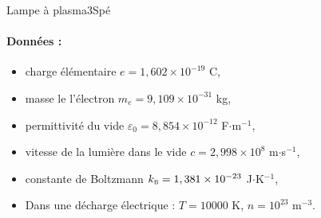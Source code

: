 \begin{exercise}{Lampe à plasma}{3}{Spé}
\paragraph{Données :}
\begin{itemize}
    \item charge élémentaire $e = 1,602\times 10^{-19}$ C,
    \item masse le l'électron $m_e = 9,109\times 10^{-31}$ kg,
    \item permittivité du vide $\varepsilon_0 = 8,854\times 10^{-12}$ F$\cdot$m$^{-1}$,
    \item vitesse de la lumière dans le vide $c = 2,998 \times 10^8$ m$\cdot$s$^{-1}$,
    \item constante de Boltzmann $k_\textsc{b} = 1,381\times 10^{-23}$ J$\cdot$K$^{-1}$,
    \item Dans une décharge électrique : $T = 10 000$ K, $n = 10^{23}$ m$^{-3}$.
\end{itemize}
\end{exercise}